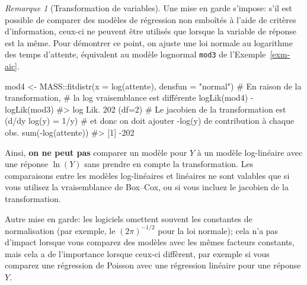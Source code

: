 \documentclass[
  11pt,
  letterpaper,
]{scrbook}
\newenvironment{Shaded}{\begin{snugshade}}{\end{snugshade}}
\newcommand{\AttributeTok}[1]{\textcolor[rgb]{0.40,0.45,0.13}{#1}}
\newcommand{\CommentTok}[1]{\textcolor[rgb]{0.37,0.37,0.37}{#1}}
\newcommand{\FunctionTok}[1]{\textcolor[rgb]{0.28,0.35,0.67}{#1}}
\newcommand{\NormalTok}[1]{\textcolor[rgb]{0.00,0.23,0.31}{#1}}
\newcommand{\OtherTok}[1]{\textcolor[rgb]{0.00,0.23,0.31}{#1}}
\newcommand{\SpecialCharTok}[1]{\textcolor[rgb]{0.37,0.37,0.37}{#1}}
\newcommand{\StringTok}[1]{\textcolor[rgb]{0.13,0.47,0.30}{#1}}
\theoremstyle{definition}
\theoremstyle{plain}
\theoremstyle{definition}
\theoremstyle{plain}
\theoremstyle{remark}
\newtheorem{refremark}{Remarque}[chapter]
\begin{document}
\begin{refremark}[Transformation de variables]
Une mise en garde s'impose: s'il est possible de comparer des modèles de
régression non emboîtés à l'aide de critères d'information, ceux-ci ne
peuvent être utilisés que lorsque la variable de réponse est la même.
Pour démontrer ce point, on ajuste une loi normale au logarithme des
temps d'attente, équivalent au modèle lognormal \texttt{mod3} de
l'Exemple~\ref{exm-aic}.

\begin{Shaded}
\begin{Highlighting}[]
\NormalTok{mod4 }\OtherTok{\textless{}{-}}\NormalTok{ MASS}\SpecialCharTok{::}\FunctionTok{fitdistr}\NormalTok{(}\AttributeTok{x =} \FunctionTok{log}\NormalTok{(attente), }\AttributeTok{densfun =} \StringTok{"normal"}\NormalTok{)}
\CommentTok{\# En raison de la transformation, }
\CommentTok{\# la log vraisemblance est différente}
\FunctionTok{logLik}\NormalTok{(mod4) }\SpecialCharTok{{-}} \FunctionTok{logLik}\NormalTok{(mod3)}
\CommentTok{\#\textgreater{} \textquotesingle{}log Lik.\textquotesingle{} 202 (df=2)}
\CommentTok{\# Le jacobien de la transformation est (d/dy log(y) = 1/y)}
\CommentTok{\# et donc on doit ajouter {-}log(y) de contribution à chaque obs.}
\FunctionTok{sum}\NormalTok{(}\SpecialCharTok{{-}}\FunctionTok{log}\NormalTok{(attente))}
\CommentTok{\#\textgreater{} [1] {-}202}
\end{Highlighting}
\end{Shaded}

Ainsi, \textbf{on ne peut pas} comparer un modèle pour \(Y\) à un modèle
log-linéaire avec une réponse \(\ln(Y)\) sans prendre en compte la
transformation. Les comparaisons entre les modèles log-linéaires et
linéaires ne sont valables que si vous utilisez la vraisemblance de
Box--Cox, ou si vous incluez le jacobien de la transformation.

\label{rem-warning-transformation}

\end{refremark}

Autre mise en garde: les logiciels omettent souvent les constantes de
normalisation (par exemple, le \((2\pi)^{-1/2}\) pour la loi normale);
cela n'a pas d'impact lorsque vous comparez des modèles avec les mêmes
facteurs constants, mais cela a de l'importance lorsque ceux-ci
diffèrent, par exemple si vous comparez une régression de Poisson avec
une régression linéaire pour une réponse \(Y\).

\end{document}
